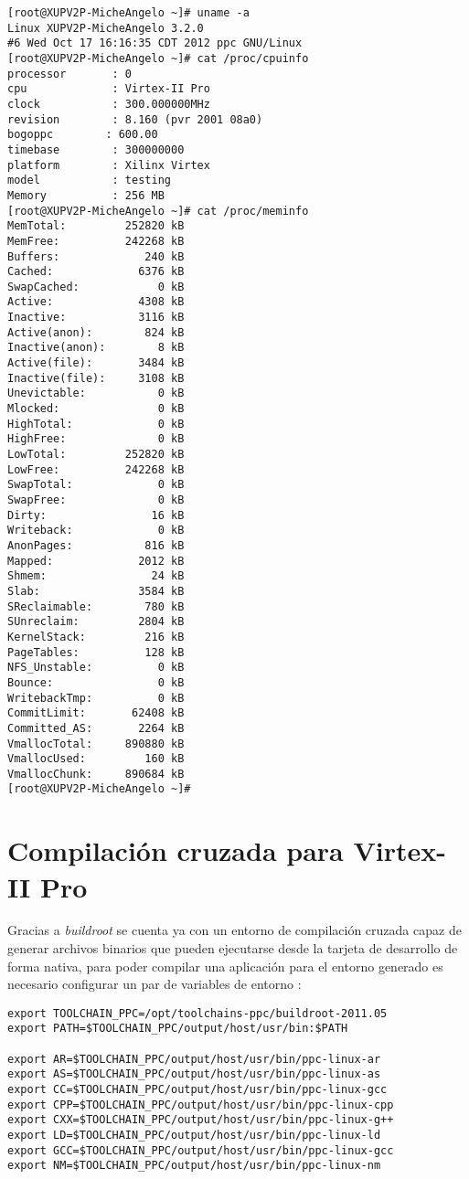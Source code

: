 \begin{verbatim}
[root@XUPV2P-MicheAngelo ~]# uname -a
Linux XUPV2P-MicheAngelo 3.2.0 
#6 Wed Oct 17 16:16:35 CDT 2012 ppc GNU/Linux
[root@XUPV2P-MicheAngelo ~]# cat /proc/cpuinfo 
processor       : 0
cpu             : Virtex-II Pro
clock           : 300.000000MHz
revision        : 8.160 (pvr 2001 08a0)
bogoppc        : 600.00
timebase        : 300000000
platform        : Xilinx Virtex
model           : testing
Memory          : 256 MB
[root@XUPV2P-MicheAngelo ~]# cat /proc/meminfo 
MemTotal:         252820 kB
MemFree:          242268 kB
Buffers:             240 kB
Cached:             6376 kB
SwapCached:            0 kB
Active:             4308 kB
Inactive:           3116 kB
Active(anon):        824 kB
Inactive(anon):        8 kB
Active(file):       3484 kB
Inactive(file):     3108 kB
Unevictable:           0 kB
Mlocked:               0 kB
HighTotal:             0 kB
HighFree:              0 kB
LowTotal:         252820 kB
LowFree:          242268 kB
SwapTotal:             0 kB
SwapFree:              0 kB
Dirty:                16 kB
Writeback:             0 kB
AnonPages:           816 kB
Mapped:             2012 kB
Shmem:                24 kB
Slab:               3584 kB
SReclaimable:        780 kB
SUnreclaim:         2804 kB
KernelStack:         216 kB
PageTables:          128 kB
NFS_Unstable:          0 kB
Bounce:                0 kB
WritebackTmp:          0 kB
CommitLimit:       62408 kB
Committed_AS:       2264 kB
VmallocTotal:     890880 kB
VmallocUsed:         160 kB
VmallocChunk:     890684 kB
[root@XUPV2P-MicheAngelo ~]#   
\end{verbatim}

\section{Compilación cruzada para Virtex-II Pro}

Gracias a \emph{buildroot} se cuenta ya con un entorno de compilación cruzada
capaz de generar archivos binarios que pueden ejecutarse desde la  tarjeta de
desarrollo de forma nativa, para poder compilar una aplicación para el entorno
generado es necesario configurar un par de variables de entorno :

\begin{lstlisting}[caption=Variables de entorno para compilación cruzada',]
export TOOLCHAIN_PPC=/opt/toolchains-ppc/buildroot-2011.05
export PATH=$TOOLCHAIN_PPC/output/host/usr/bin:$PATH
 
export AR=$TOOLCHAIN_PPC/output/host/usr/bin/ppc-linux-ar
export AS=$TOOLCHAIN_PPC/output/host/usr/bin/ppc-linux-as
export CC=$TOOLCHAIN_PPC/output/host/usr/bin/ppc-linux-gcc
export CPP=$TOOLCHAIN_PPC/output/host/usr/bin/ppc-linux-cpp
export CXX=$TOOLCHAIN_PPC/output/host/usr/bin/ppc-linux-g++
export LD=$TOOLCHAIN_PPC/output/host/usr/bin/ppc-linux-ld
export GCC=$TOOLCHAIN_PPC/output/host/usr/bin/ppc-linux-gcc
export NM=$TOOLCHAIN_PPC/output/host/usr/bin/ppc-linux-nm
\end{lstlisting}

